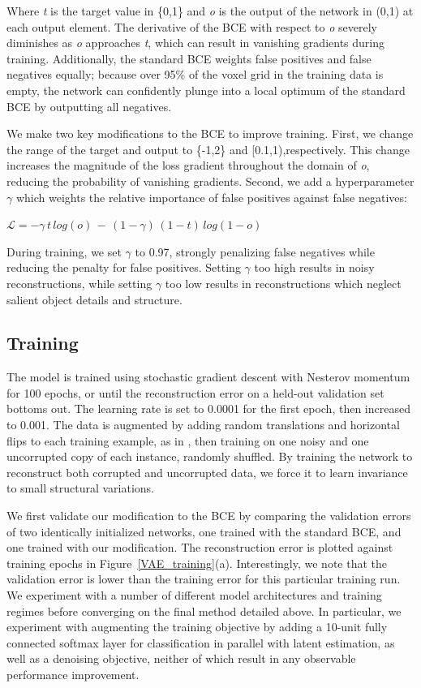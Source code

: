 \documentclass{article}
\begin{document}
Where \textit{t} is the target value in \{0,1\} and \textit{o} is the output of the network in (0,1) at each output element. The derivative of the BCE with respect to \textit{o} severely diminishes as \textit{o} approaches \textit{t}, which can result in vanishing gradients during training. Additionally, the standard BCE weights false positives and false negatives equally; because over 95\% of the voxel grid in the training data is empty, the network can confidently plunge into a local optimum of the standard BCE by outputting all negatives.

We make two key modifications to the BCE to improve training. First, we change the range of the target and output to \{-1,2\} and [0.1,1),respectively. This change increases the magnitude of the loss gradient throughout the domain of \textit{o}, reducing the probability of vanishing gradients. Second, we add a hyperparameter $\gamma$ which weights the relative importance of false positives against false negatives:

\begin{center}$\mathcal{L} = -\gamma\,t\,log(o)\,-\,(1-\gamma)\,(1-t)\,log(1-o)$\end{center}

During training, we set $\gamma$ to 0.97, strongly penalizing false negatives while reducing the penalty for false positives. Setting $\gamma$ too high results in noisy reconstructions, while setting $\gamma$ too low results in reconstructions which neglect salient object details and structure.

\subsection{Training}

The model is trained using stochastic gradient descent with Nesterov momentum \citep{Nesterov} for 100 epochs, or until the reconstruction error on a held-out validation set bottoms out. The learning rate is set to 0.0001 for the first epoch, then increased to 0.001. The data is augmented by adding random translations and horizontal flips to each training example, as in \citep{VoxNet}, then training on one noisy and one uncorrupted copy of each instance, randomly shuffled. By training the network to reconstruct both corrupted and uncorrupted data, we force it to learn invariance to small structural variations.

We first validate our modification to the BCE by comparing the validation errors of two identically initialized networks, one trained with the standard BCE, and one trained with our modification. The reconstruction error is plotted against training epochs in Figure~\ref{VAE_training}(a). Interestingly, we note that the validation error is lower than the training error for this particular training run. We experiment with a number of different model architectures and training regimes before converging on the final method detailed above. In particular, we experiment with augmenting the training objective by adding a 10-unit fully connected softmax layer for classification in parallel with latent estimation, as well as a denoising objective, neither of which result in any observable performance improvement.
\end{document}
